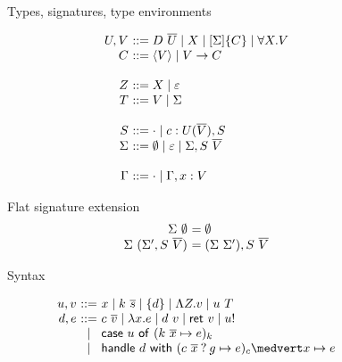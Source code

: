 \documentclass[preprint]{sigplanconf}
\makeatletter
\newcommand{\set}[1]{\{#1\}}
\newcommand{\many}{\overline}
\newcommand{\seml}{\left\llbracket}
\newcommand{\semr}{\right\rrbracket}
\newcommand{\FV}{\mathit{FV}}
\newcommand{\dom}{\mathit{dom}}
\newcommand\ba{\begin{array}}
\newcommand\ea{\end{array}}
\newcommand{\bl}{\ba{@{}c@{}}}
\newcommand{\el}{\ea}
\newcommand{\val}[3]  {#1 \vdash {#2} : {#3}}
\newcommand{\rt}[1]{\langle{#1}\rangle}   %
\newcommand{\sig}{S}
\newcommand{\sigs}{\Sigma}
\newcommand{\effbox}[1]{[#1]}
\newcommand{\key}[1]{\mathsf{#1}}
\newcommand{\handleSymbol}{\mathbin{?}}
\newcommand{\handle}[2]{{#1} \handleSymbol {#2}}
\newcommand{\thunk}[1]{\{{#1}\}}
\newcommand{\force}[1]{{#1}!}
\makeatother
\begin{document}

\begin{figure*}

Types, signatures, type environments

\[
\begin{array}{@{}r@{~}l@{}}
U, V &::= D~\many{U} \mid X \mid \effbox{\sigs}\thunk{C} \mid \forall X.V \\
C    &::= \rt{V} \mid V \to C \\  %
\\
Z    &::= X \mid \varepsilon \\
T    &::= V \mid \sigs \\
\\
\sig  &::= \cdot \mid c : U(\many{V}), \sig \\
\sigs &::=
  \emptyset \mid \varepsilon \mid \sigs, \sig~\many{V} \\
\\
\Gamma &::= \cdot \mid \Gamma, x:V \\
\end{array}
\]

Flat signature extension
\[
\begin{array}{@{}r@{~}l@{}}
\sigs~\emptyset &= \emptyset \\
\sigs~(\sigs', \sig~\many{V}) &= (\sigs~\sigs'), \sig~\many{V} \\
\end{array}
\]

Syntax

\[
\begin{array}{@{}r@{~}c@{~}l@{}}
u, v &::=& x \mid k~\many{s} \mid \thunk{d}  %
             \mid \Lambda Z.v \mid u~T \\
d, e &::=& c~\many{v}                        %
   \mid \lambda x.e \mid d~v \mid \key{ret}~v \mid \force{u} \\
  &\mid& \key{case}~u~\key{of}~
           (k~\many{x} \mapsto e)_k \\
  &\mid& \key{handle} ~d~ \key{with}~
           (\handle{c~\many{x}}{g} \mapsto e)_c \medvert
           x        \mapsto e \\
\end{array}
\]


\end{figure*}
\end{document}
